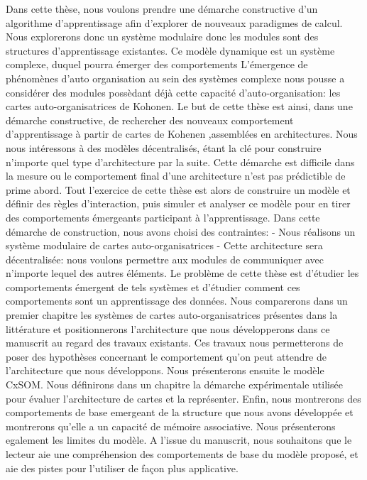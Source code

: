 \documentclass[../main]{subfiles}
\begin{document}
Dans cette thèse, nous voulons prendre une démarche constructive d'un algorithme d'apprentissage afin d'explorer de nouveaux paradigmes de calcul. Nous explorerons donc un système modulaire donc les modules sont des structures d'apprentissage existantes. Ce modèle dynamique est un système complexe, duquel pourra émerger des comportements
L'émergence de phénomènes d'auto organisation au sein des systèmes complexe nous pousse a considérer des modules possèdant déjà cette capacité d'auto-organisation: les cartes auto-organisatrices de Kohonen.
Le but de cette thèse est ainsi, dans une démarche constructive, de rechercher des nouveaux comportement d'apprentissage  à partir de cartes de Kohenen ,assemblées en architectures.
Nous nous intéressons à des modèles décentralisés, étant la clé pour construire n'importe quel type d'architecture par la suite. 
Cette démarche est difficile dans la mesure ou le comportement final d'une architecture n'est pas prédictible de prime abord. Tout l'exercice de cette thèse est alors de construire un modèle et définir des règles d'interaction, puis simuler et analyser ce modèle pour en tirer des comportements émergeants participant à l'apprentissage.
Dans cette démarche de construction, nous avons choisi des contraintes:
- Nous réalisons un système modulaire de cartes auto-organisatrices
- Cette architecture sera décentralisée: nous voulons permettre aux modules de communiquer avec n'importe lequel des autres éléments.
Le problème de cette thèse est d'étudier les comportements émergent de tels systèmes et d'étudier comment ces comportements sont un apprentissage des données.
Nous comparerons dans un premier chapitre les systèmes de cartes auto-organisatrices présentes dans la littérature et positionnerons l'architecture que nous développerons dans ce manuscrit au regard des travaux existants. Ces travaux nous permetterons de poser des hypothèses concernant le comportement qu'on peut attendre de l'architecture que nous développons. Nous présenterons ensuite le modèle CxSOM.
Nous définirons dans un chapitre la démarche expérimentale utilisée pour évaluer l'architecture de cartes et la représenter. Enfin, nous montrerons des comportements de base emergeant de la structure que nous avons développée et montrerons qu'elle a un capacité de mémoire associative. Nous présenterons egalement les limites du modèle. 
A l'issue du manuscrit, nous souhaitons que le lecteur aie une compréhension des comportements de base du modèle proposé, et aie des pistes pour l'utiliser de façon plus applicative.
\end{document}
